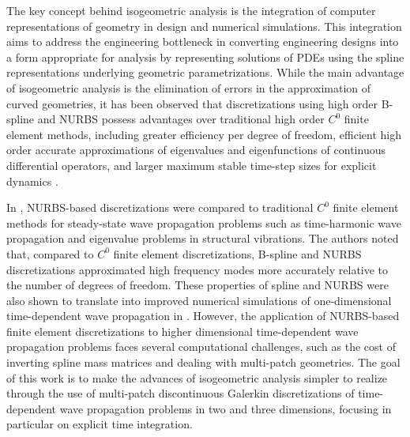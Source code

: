 \documentclass[preprint,10pt]{elsarticle}
\begin{document}
The key concept behind isogeometric analysis is the integration of computer representations of geometry in design and numerical simulations.  
This integration aims to address the engineering bottleneck in converting engineering designs into a form appropriate for analysis \cite{hughes2005isogeometric} by {representing solutions of PDEs using the spline representations underlying geometric parametrizations}.  While the main advantage of isogeometric analysis is the elimination of errors in the approximation of curved geometries, it has been observed that discretizations using high order B-spline and NURBS possess advantages over traditional high order $C^0$ finite element methods, including greater efficiency per degree of freedom, efficient high order accurate approximations of eigenvalues and eigenfunctions of continuous differential operators, and {larger maximum stable time-step sizes for explicit dynamics} \cite{hughes2008duality,evans2009n, hughes2014finite}.  

In \cite{hughes2008duality}, NURBS-based discretizations were compared to traditional $C^0$ finite element methods for steady-state wave propagation problems such as time-harmonic wave propagation and eigenvalue problems in structural vibrations.  The authors noted that, compared to $C^0$ finite element discretizations, B-spline and NURBS discretizations approximated high frequency modes more accurately relative to the number of degrees of freedom.  These properties of spline and NURBS were also shown to translate into improved numerical simulations of one-dimensional time-dependent wave propagation in \cite{hughes2014finite}.  However, {the application of NURBS-based finite element discretizations to higher dimensional time-dependent wave propagation problems faces several computational challenges, such as the cost of inverting spline mass matrices and dealing with multi-patch geometries}.
The goal of this work is to make the advances of isogeometric analysis simpler to realize through the use of multi-patch discontinuous Galerkin discretizations of time-dependent wave propagation problems in two and three dimensions, focusing in particular on explicit time integration.  
\end{document}
